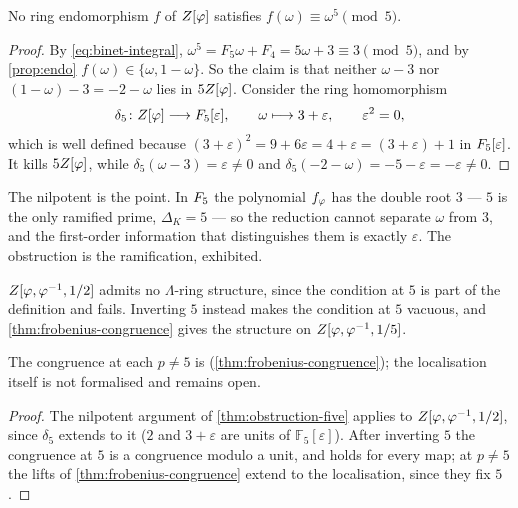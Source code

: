 \begin{theorem}\label{thm:obstruction-five}
No ring endomorphism $f$ of $Z[\varphi]$ satisfies $f(\omega)\equiv\omega^5\pmod5$.
\end{theorem}
\begin{proof}
By \eqref{eq:binet-integral}, $\omega^5=F_5\omega+F_4=5\omega+3\equiv3\pmod 5$,
and by \cref{prop:endo} $f(\omega)\in\{\omega,1-\omega\}$.  So the claim is that
neither $\omega-3$ nor $(1-\omega)-3=-2-\omega$ lies in $5Z[\varphi]$.  Consider the
ring homomorphism
\[
  \delta_5\colon Z[\varphi]\longrightarrow F_5[\varepsilon],\qquad
  \omega\longmapsto3+\varepsilon,\qquad \varepsilon^2=0,
\]
which is well defined because $(3+\varepsilon)^2=9+6\varepsilon=4+\varepsilon
=(3+\varepsilon)+1$ in $F_5[\varepsilon]$.  It kills $5Z[\varphi]$, while
$\delta_5(\omega-3)=\varepsilon\ne0$ and $\delta_5(-2-\omega)=-5-\varepsilon
=-\varepsilon\ne0$.
\end{proof}

The nilpotent is the point.  In $F_5$ the polynomial $f_\varphi$ has the double
root $3$ --- $5$ is the only ramified prime, $\Delta_K=5$ --- so the reduction
cannot separate $\omega$ from $3$, and the first-order information that
distinguishes them is exactly $\varepsilon$.  The obstruction is the
ramification, exhibited.

\begin{corollary}\label{cor:localisation}
$Z[\varphi,\varphi^{-1},1/2]$ admits no $\Lambda$-ring structure, since the
condition at $5$ is part of the definition and fails.  Inverting $5$ instead
makes the condition at $5$ vacuous, and \cref{thm:frobenius-congruence} gives the
structure on $Z[\varphi,\varphi^{-1},1/5]$.
\end{corollary}

The congruence at each $p\ne5$ is  (\cref{thm:frobenius-congruence}); the
localisation itself is not formalised and remains open.
\begin{proof}
The nilpotent argument of \cref{thm:obstruction-five} applies to $Z[\varphi,\varphi^{-1},1/2]$,
since $\delta_5$ extends to it ($2$ and $3+\varepsilon$ are units of $\mathbb F_5[\varepsilon]$).
After inverting $5$ the congruence at $5$ is a congruence modulo a unit, and holds for every map; at $p\ne5$ the lifts of \cref{thm:frobenius-congruence} extend to the localisation, since they fix $5$.
\end{proof}

